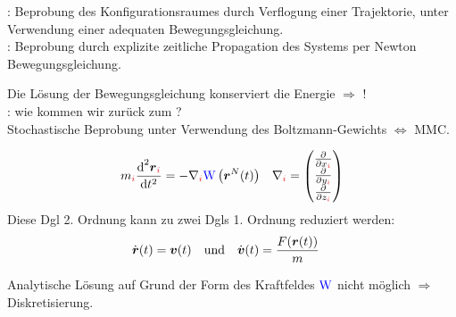 \begin{sectionbox}\nospacing
  : Beprobung des Konfigurationsraumes durch Verflogung
  einer Trajektorie, unter Verwendung einer adequaten
  Bewegungsgleichung.\\
  : Beprobung durch explizite zeitliche Propagation des Systems per Newton Bewegungsgleichung.
\end{sectionbox}
\begin{notebox}
  Die Lösung der Bewegungsgleichung konserviert die Energie $\Rightarrow$ !\\
  : wie kommen wir zurück zum ?\\
  Stochastische Beprobung unter Verwendung des Boltzmann-Gewichts $\Longleftrightarrow$ MMC.
\end{notebox}
\begin{sectionbox}[Zu lösen]\nospacing
  \begin{align}
    m_{\idxi}\frac{\diff^2\rveci}{\diff t^2}=-\nabla_{\idxi}\Wpot\left(\rvec^N(t)\right)&&
           \nabla_{\idxi}=\vect{\frac{\partial}{\partial x_{\idxi}} \\ \frac{\partial}{\partial y_{\idxi}} \\ \frac{\partial}{\partial z_{\idxi}}}\label{eq:eqOfMotion}
  \end{align}
  Diese Dgl 2. Ordnung kann zu zwei Dgls 1. Ordnung reduziert werden:
  \begin{align}
    &\dot{\boldsymbol r }(t)=\boldsymbol v (t)&&\text{und}&&\dot{\boldsymbol v }(t)=\frac{F(\boldsymbol r (t))}{m}\label{eq:eqOfMotion2}
  \end{align}
\end{sectionbox}
\begin{notebox}[Problem]
  Analytische Lösung auf Grund der Form des Kraftfeldes $\textcolor{blue}{\mathrm{W}}$ nicht möglich $\Rightarrow$ Diskretisierung.
\end{notebox}
